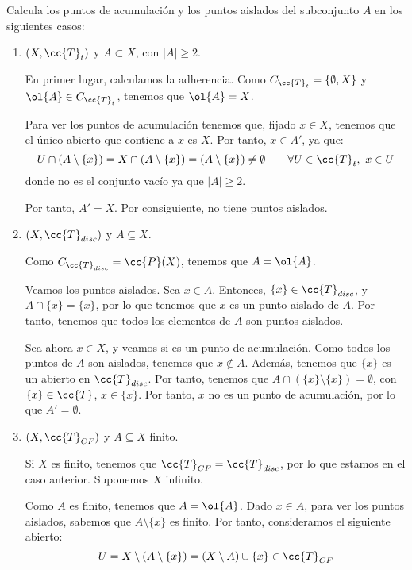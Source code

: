 \begin{ejercicio}
    Calcula los puntos de acumulación y los puntos aislados del subconjunto $A$ en los siguientes casos:
    \begin{enumerate}
        \item $(X,\cc{T}_t)$ y $A\subset X$, con $|A|\geq 2$.

        En primer lugar, calculamos la adherencia. Como $C_{\cc{T}_t}=\{\emptyset,X\}$ y $\ol{A}\in C_{\cc{T}_t}$, tenemos que $\ol{A}=X$.

        Para ver los puntos de acumulación tenemos que, fijado $x\in X$, tenemos que el único abierto que contiene a $x$ es $X$. Por tanto, $x\in A'$, ya que:
        \begin{equation*}
            U\cap (A\setminus \{x\})
            = X\cap (A\setminus \{x\})
            = (A\setminus \{x\})
            \neq \emptyset \qquad \forall U\in \cc{T}_t,~x\in U
        \end{equation*}
        donde no es el conjunto vacío ya que $|A|\geq 2$.

        Por tanto, $A'=X$. Por consiguiente, no tiene puntos aislados.
        
        \item $(X,\cc{T}_{disc})$ y $A\subseteq X$.

        Como $C_{\cc{T}_{disc}}=\cc{P}(X)$, tenemos que $A=\ol{A}$.

        Veamos los puntos aislados. Sea $x\in A$. Entonces, $\{x\}\in \cc{T}_{disc}$, y $A\cap \{x\}=\{x\}$, por lo que tenemos que $x$ es un punto aislado de $A$. Por tanto, tenemos que todos los elementos de $A$ son puntos aislados.
        
        Sea ahora $x\in X$, y veamos si es un punto de acumulación. Como todos los puntos de $A$ son aislados, tenemos que $x\notin A$. Además, tenemos que $\{x\}$ es un abierto en $\cc{T}_{disc}$. Por tanto, tenemos que $A\cap (\{x\}\setminus \{x\})=\emptyset$, con $\{x\}\in \cc{T}$, $x\in \{x\}$. Por tanto, $x$ no es un punto de acumulación, por lo que $A'=\emptyset$.
        
        \item $(X,\cc{T}_{CF})$ y $A\subseteq X$ finito.

        Si $X$ es finito, tenemos que $\cc{T}_{CF}=\cc{T}_{disc}$, por lo que estamos en el caso anterior. Suponemos $X$ infinito.
        
        Como $A$ es finito, tenemos que $A=\ol{A}$. Dado $x\in A$, para ver los puntos aislados, sabemos que $A\setminus \{x\}$ es finito. Por tanto, consideramos el siguiente abierto:
        \begin{equation*}
            U=X\setminus (A\setminus \{x\}) = (X\setminus A)\cup \{x\} \in \cc{T}_{CF}
        \end{equation*}


\end{enumerate}
\end{ejercicio}
